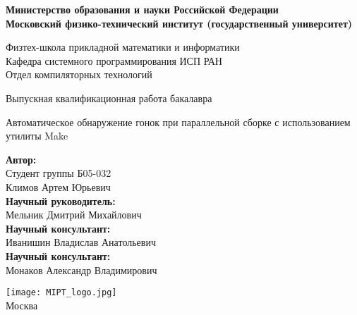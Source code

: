 \begin{center}
    \large\textbf{Министерство образования и науки Российской Федерации \\
    Московский физико-технический институт (государственный
    университет)} \\
    \vspace{1cm}

    Физтех-школа прикладной математики и информатики \\

    Кафедра системного программирования ИСП РАН \\
    Отдел компиляторных технологий\\

    \vspace{3em}

    Выпускная квалификационная работа бакалавра
\end{center}

\begin{center}
    \vspace{\fill}
    \LARGE{Автоматическое обнаружение гонок при параллельной сборке с использованием утилиты Make}

    \vspace{\fill}
\end{center}


\begin{flushright}
    \textbf{Автор:} \\
    Студент группы Б05-032 \\
    Климов Артем Юрьевич \\
    \vspace{2em}
    \textbf{Научный руководитель:} \\
    Мельник Дмитрий Михайлович \\
    \vspace{2em}
    \textbf{Научный консультант:} \\
    Иванишин Владислав Анатольевич \\
    \vspace{2em}
    \textbf{Научный консультант:} \\
    Монаков Александр Владимирович \\
\end{flushright}

\vspace{7em}

\begin{center}
    \texttt{[image: MIPT\_logo.jpg]}\\
    Москва \the\year{}
\end{center}

\thispagestyle{empty}

\newpage
\setcounter{page}{2}
\fancyfoot[c]{\thepage}
\fancyhead[L]{\leftmark}
\fancyhead[R]{}